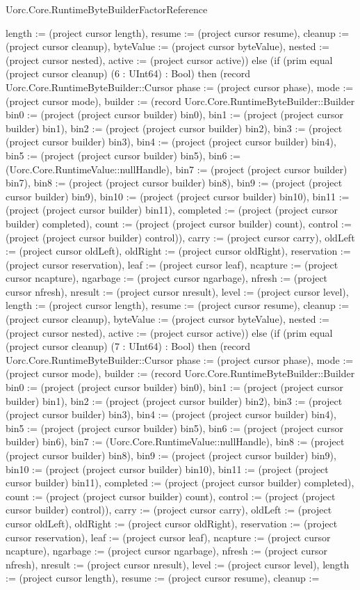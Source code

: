 \begin{lexlean}{Uorc.Core.RuntimeByteBuilderFactorReference}
\begin{semanticmodule}
{length := (project cursor length), resume := (project cursor resume), cleanup := (project cursor cleanup), byteValue := (project cursor byteValue), nested := (project cursor nested), active := (project cursor active)}) else (if (prim equal (project cursor cleanup) (6 : UInt64) : Bool) then (record Uorc.Core.RuntimeByteBuilder::Cursor {phase := (project cursor phase), mode := (project cursor mode), builder := (record Uorc.Core.RuntimeByteBuilder::Builder {bin0 := (project (project cursor builder) bin0), bin1 := (project (project cursor builder) bin1), bin2 := (project (project cursor builder) bin2), bin3 := (project (project cursor builder) bin3), bin4 := (project (project cursor builder) bin4), bin5 := (project (project cursor builder) bin5), bin6 := (Uorc.Core.RuntimeValue::nullHandle), bin7 := (project (project cursor builder) bin7), bin8 := (project (project cursor builder) bin8), bin9 := (project (project cursor builder) bin9), bin10 := (project (project cursor builder) bin10), bin11 := (project (project cursor builder) bin11), completed := (project (project cursor builder) completed), count := (project (project cursor builder) count), control := (project (project cursor builder) control)}), carry := (project cursor carry), oldLeft := (project cursor oldLeft), oldRight := (project cursor oldRight), reservation := (project cursor reservation), leaf := (project cursor leaf), ncapture := (project cursor ncapture), ngarbage := (project cursor ngarbage), nfresh := (project cursor nfresh), nresult := (project cursor nresult), level := (project cursor level), length := (project cursor length), resume := (project cursor resume), cleanup := (project cursor cleanup), byteValue := (project cursor byteValue), nested := (project cursor nested), active := (project cursor active)}) else (if (prim equal (project cursor cleanup) (7 : UInt64) : Bool) then (record Uorc.Core.RuntimeByteBuilder::Cursor {phase := (project cursor phase), mode := (project cursor mode), builder := (record Uorc.Core.RuntimeByteBuilder::Builder {bin0 := (project (project cursor builder) bin0), bin1 := (project (project cursor builder) bin1), bin2 := (project (project cursor builder) bin2), bin3 := (project (project cursor builder) bin3), bin4 := (project (project cursor builder) bin4), bin5 := (project (project cursor builder) bin5), bin6 := (project (project cursor builder) bin6), bin7 := (Uorc.Core.RuntimeValue::nullHandle), bin8 := (project (project cursor builder) bin8), bin9 := (project (project cursor builder) bin9), bin10 := (project (project cursor builder) bin10), bin11 := (project (project cursor builder) bin11), completed := (project (project cursor builder) completed), count := (project (project cursor builder) count), control := (project (project cursor builder) control)}), carry := (project cursor carry), oldLeft := (project cursor oldLeft), oldRight := (project cursor oldRight), reservation := (project cursor reservation), leaf := (project cursor leaf), ncapture := (project cursor ncapture), ngarbage := (project cursor ngarbage), nfresh := (project cursor nfresh), nresult := (project cursor nresult), level := (project cursor level), length := (project cursor length), resume := (project cursor resume), cleanup := }
\end{semanticmodule}
\end{lexlean}

